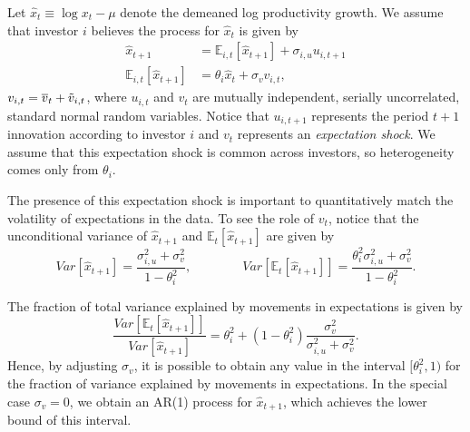 Let $\hat{x}_t \equiv \log x_t - \mu $  denote the demeaned log productivity growth. We assume that investor $i$ believes the process for $\hat{x}_t$ is given by
\begin{align}
    \hat{x}_{t+1} &= \mathbb{E}_{i,t}[\hat{x}_{t+1}] + \sigma_{i,u} u_{i,t+1}\\
    \mathbb{E}_{i,t}[\hat{x}_{t+1}] &= \theta_i \hat{x}_t + \sigma_{v} v_{i,t},
\end{align}
$v_{i,t} = \overline{v}_t + \Tilde{v}_{i,t}$, 
where $u_{i,t}$ and $v_t$ are mutually independent, serially uncorrelated, standard normal random variables. 
Notice that $u_{i,t+1}$ represents the period $t+1$ innovation according to investor $i$ and $v_t$ represents an \textit{expectation shock}. We assume that this expectation shock is common across investors, so heterogeneity comes only from $\theta_i$. 

The presence of this expectation shock is important to quantitatively match the volatility of expectations in the data. 
To see the role of $v_t$, notice that the unconditional variance of $\hat{x}_{t+1}$ and $\mathbb{E}_t[\hat{x}_{t+1}]$ are given by
\begin{equation}
    Var[\hat{x}_{t+1}] = \frac{\sigma_{i,u}^2 + \sigma_v^2}{1-\theta_i^2}, \qquad \qquad Var[\mathbb{E}_t[\hat{x}_{t+1}]] =  \frac{\theta_i^2 \sigma_{i,u}^2 + \sigma_v^2}{1-\theta_i^2}.
\end{equation}

The fraction of total variance explained by movements in expectations is given by
\begin{equation}
    \frac{Var[\mathbb{E}_t[\hat{x}_{t+1}]]}{Var[\hat{x}_{t+1}]} = \theta_i^2 + (1-\theta_i^2) \frac{\sigma_v^2}{\sigma_{i,u}^2 + \sigma_v^2}.
\end{equation}
Hence, by adjusting $\sigma_v$, it is possible to obtain any value in the interval $[\theta_i^2, 1)$ for the fraction of variance explained by movements in expectations. In the special case $\sigma_v = 0$, we obtain an AR(1) process for $\hat{x}_{t+1}$, which achieves the lower bound of this interval. 



